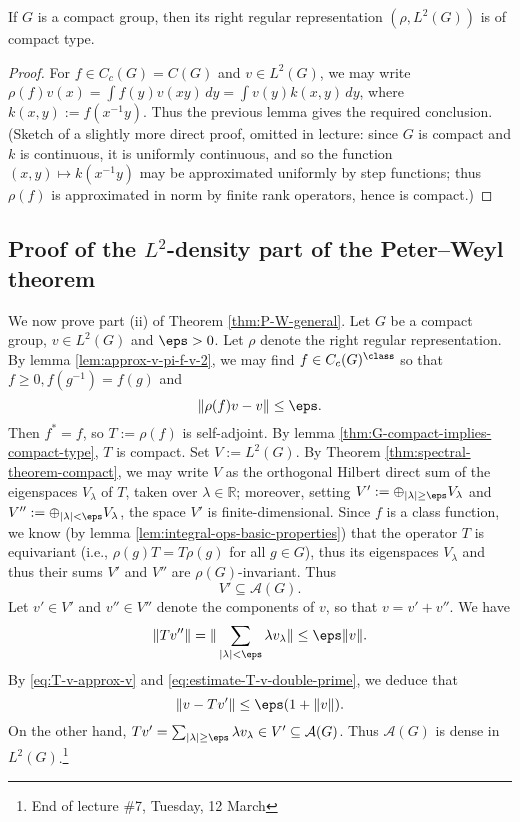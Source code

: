 \documentclass[reqno]{amsart} 
\begin{document}
\begin{lemma}\label{thm:G-compact-implies-compact-type}
  If $G$ is a compact group, then its right regular representation $(\rho,L^2(G))$ is of compact type.
\end{lemma}
\begin{proof}
  For $f \in C_c(G) = C(G)$ and $v \in L^2(G)$, we may write $\rho(f) v(x) = \int f(y) v(x y) \, d y = \int v(y) k(x,y) \, d y$, where $k(x,y) := f(x^{-1} y)$.  Thus the previous lemma gives the required conclusion.  (Sketch of a slightly more direct proof, omitted in lecture: since $G$ is compact and $k$ is continuous, it is uniformly continuous, and so the function $(x,y) \mapsto k(x^{-1} y)$ may be approximated uniformly by step functions; thus $\rho(f)$ is approximated in norm by finite rank operators, hence is compact.)
\end{proof}

\subsection{Proof of the \texorpdfstring{$L^2$}{L2}-density
  part of the Peter--Weyl theorem}\label{sec:cnh2vosmij}
We now prove part (ii) of Theorem \ref{thm:P-W-general}.  Let $G$ be a compact group, $v \in L^2(G)$ and $\eps > 0$.  Let $\rho$ denote the right regular representation.  By lemma \ref{lem:approx-v-pi-f-v-2}, we may find $f \in C_c(G)^{\class}$ so that $f \geq 0, f(g^{-1}) = f(g)$ and
\begin{equation}\label{eq:T-v-approx-v}
  \|\rho(f) v - v\| \leq \eps.
\end{equation}
Then $f^* = f$, so $T := \rho(f)$ is self-adjoint.  By lemma \ref{thm:G-compact-implies-compact-type}, $T$ is compact.  Set $V := L^2(G)$.  By Theorem \ref{thm:spectral-theorem-compact}, we may write $V$ as the orthogonal Hilbert direct sum of the eigenspaces $V_\lambda$ of $T$, taken over $\lambda \in \mathbb{R}$; moreover, setting $V' := \oplus_{|\lambda| \geq \eps} V_\lambda$ and $V'' := \oplus_{|\lambda| < \eps} V_\lambda$, the space $V'$ is finite-dimensional.  Since $f$ is a class function, we know (by lemma \ref{lem:integral-ops-basic-properties}) that the operator $T$ is equivariant (i.e., $\rho(g) T = T \rho(g)$ for all $g \in G$), thus its eigenspaces $V_\lambda$ and thus their sums $V'$ and $V''$ are $\rho(G)$-invariant.  Thus
\begin{equation}\label{eq:V'-finite}
  V' \subseteq \mathcal{A}(G).
\end{equation}
Let $v' \in V'$ and $v'' \in V''$ denote the components of $v$, so that $v = v' + v''$.  We have
\begin{equation}\label{eq:estimate-T-v-double-prime}
  \|T v''\|
  = \|\sum_{|\lambda| < \eps } \lambda v_\lambda \|
  \leq \eps \|v\|.
\end{equation}
By \eqref{eq:T-v-approx-v} and \eqref{eq:estimate-T-v-double-prime}, we deduce that
\begin{equation*}
  \|v - T v'\| \leq \eps (1 + \|v\|).
\end{equation*}
On the other hand, $T v' = \sum_{|\lambda| \geq \eps} \lambda v_\lambda \in V' \subseteq \mathcal{A}(G)$.  Thus $\mathcal{A}(G)$ is dense in $L^2(G)$.\footnote{End of lecture \#7, Tuesday, 12 March}
\end{document}
